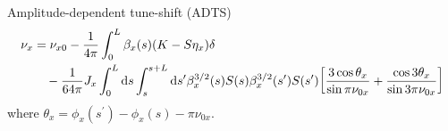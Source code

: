 \documentclass[aspectratio=169]{beamer}
\begin{document}
\begin{frame}{Amplitude-dependent tune-shift (ADTS)}
    \begin{equation*}
        \begin{aligned}
            \nu_x & = \nu_{x0} - \frac{1}{4\pi}\int_0^L\beta_x(s)(K-S\eta_x)\delta  \\ & \quad - \frac{1}{64\pi} J_x \int_0^L \dd s \int_s^{s+L}\dd s^\prime \beta_x^{3/2}(s)S(s)\beta_x^{3/2}(s^\prime)S(s^\prime)\qty[
                \frac{3\cos\theta_x}{\sin\pi\nu_{0x}} + \frac{\cos3\theta_x}{\sin3\pi\nu_{0x}}]
        \end{aligned}
    \end{equation*}
    where $\theta_x = \phi_x(s^\prime) - \phi_x(s) - \pi\nu_{0x}$.
\end{frame}
%
%
\end{document}

